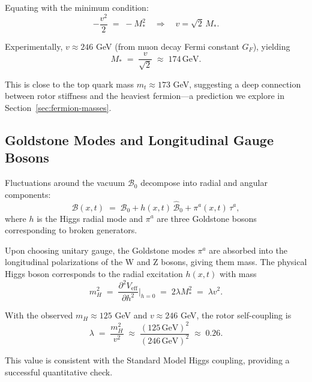 \documentclass[11pt,a4paper]{article}
\newcommand{\Biv}{\mathcal{B}}
\theoremstyle{definition}
\theoremstyle{plain}
\theoremstyle{remark}
\begin{document}
Equating with the minimum condition:
\begin{equation}
  -\frac{v^2}{2} \;=\; -M_\ast^2 \quad\Rightarrow\quad v = \sqrt{2}\,M_\ast.
\end{equation}

Experimentally, $v \approx 246$ GeV (from muon decay Fermi constant $G_F$), yielding
\begin{equation}
  \boxed{M_\ast \;=\; \frac{v}{\sqrt{2}} \;\approx\; 174\,\text{GeV}.}
  \label{eq:rotor-stiffness}
\end{equation}

This is close to the top quark mass $m_t \approx 173$ GeV, suggesting a deep connection between rotor stiffness and the heaviest fermion---a prediction we explore in Section~\ref{sec:fermion-masses}.

\subsection{Goldstone Modes and Longitudinal Gauge Bosons}

Fluctuations around the vacuum $\Biv_0$ decompose into radial and angular components:
\begin{equation}
  \Biv(x,t) \;=\; \Biv_0 + h(x,t)\,\hat{\Biv}_0 + \pi^a(x,t)\,\tau^a,
\end{equation}
where $h$ is the Higgs radial mode and $\pi^a$ are three Goldstone bosons corresponding to broken generators.

Upon choosing unitary gauge, the Goldstone modes $\pi^a$ are absorbed into the longitudinal polarizations of the W and Z bosons, giving them mass. The physical Higgs boson corresponds to the radial excitation $h(x,t)$ with mass
\begin{equation}
  m_H^2 \;=\; \frac{\partial^2 V_{\text{eff}}}{\partial h^2}\bigg|_{h=0}
  \;=\; 2\lambda M_\ast^2
  \;=\; \lambda v^2.
\end{equation}

With the observed $m_H \approx 125$ GeV and $v \approx 246$ GeV, the rotor self-coupling is
\begin{equation}
  \lambda \;=\; \frac{m_H^2}{v^2} \;\approx\; \frac{(125\,\text{GeV})^2}{(246\,\text{GeV})^2} \;\approx\; 0.26.
\end{equation}

This value is consistent with the Standard Model Higgs coupling, providing a successful quantitative check.

\vspace{1em}
\end{document}
